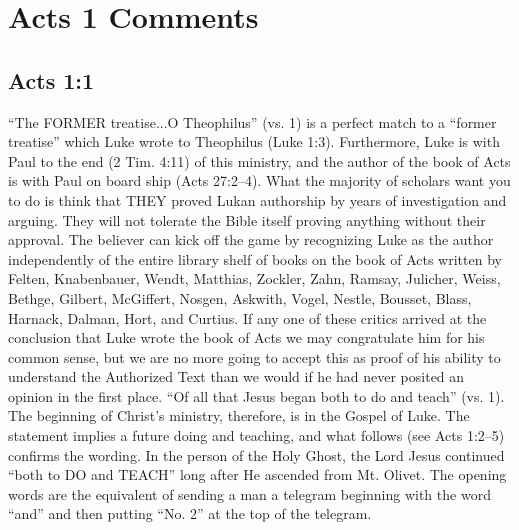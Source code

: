 \section{Acts 1 Comments}


\subsection{Acts 1:1}
“The FORMER treatise...O Theophilus” (vs. 1) is a perfect match to a “former treatise”
which Luke wrote to Theophilus (Luke 1:3). Furthermore, Luke is with Paul to the end (2 Tim. 4:11)
of this ministry, and the author of the book of Acts is with Paul on board ship (Acts 27:2–4).
What the majority of scholars want you to do is think that THEY proved Lukan authorship by
years of investigation and arguing. They will not tolerate the Bible itself proving anything without
their approval. The believer can kick off the game by recognizing Luke as the author independently of
the entire library shelf of books on the book of Acts written by Felten, Knabenbauer, Wendt, Matthias,
Zockler, Zahn, Ramsay, Julicher, Weiss, Bethge, Gilbert, McGiffert, Nosgen, Askwith, Vogel, Nestle,
Bousset, Blass, Harnack, Dalman, Hort, and Curtius. If any one of these critics arrived at the
conclusion that Luke wrote the book of Acts we may congratulate him for his common sense, but we
are no more going to accept this as proof of his ability to understand the Authorized Text than we
would if he had never posited an opinion in the first place.
“Of all that Jesus began both to do and teach” (vs. 1). The beginning of Christ’s ministry,
therefore, is in the Gospel of Luke. The statement implies a future doing and teaching, and what
follows (see Acts 1:2–5) confirms the wording. In the person of the Holy Ghost, the Lord Jesus
continued “both to DO and TEACH” long after He ascended from Mt. Olivet. The opening words
are the equivalent of sending a man a telegram beginning with the word “and” and then putting “No.
2” at the top of the telegram.


